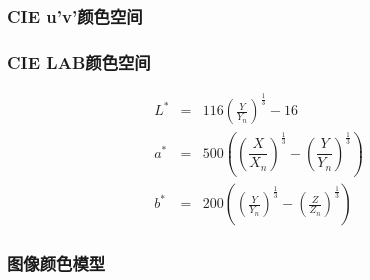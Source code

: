 \documentclass{beamer}
\begin{document}
{{\begin{frame}
  {\hspace{4em}}
\end{frame}}{\begin{frame}
  \frametitle{CIE u'v'颜色空间}
  
  {\hspace{3em}}
\end{frame}}{\begin{frame}
  \frametitle{CIE LAB颜色空间}
  \begin{eqnarray*}
    L^{\ast} & = & 116 \left( \frac{Y}{Y_n} \right)^{\frac{1}{3}} - 16\\
    a^{\ast} & = & 500 \left( \left( \dfrac{X}{X_n} \right)^{\frac{1}{3}} -
    \left( \dfrac{Y}{Y_n} \right)^{\frac{1}{3}} \right)\\
    b^{\ast} & = & 200 \left( \left( \frac{Y}{Y_n} \right)^{\frac{1}{3}} -
    \left( \frac{Z}{Z_n} \right)^{\frac{1}{3}} \right)
  \end{eqnarray*}
\end{frame}}{\begin{frame}
  \frametitle{图像颜色模型}
  

\end{frame}}}
\end{document}
